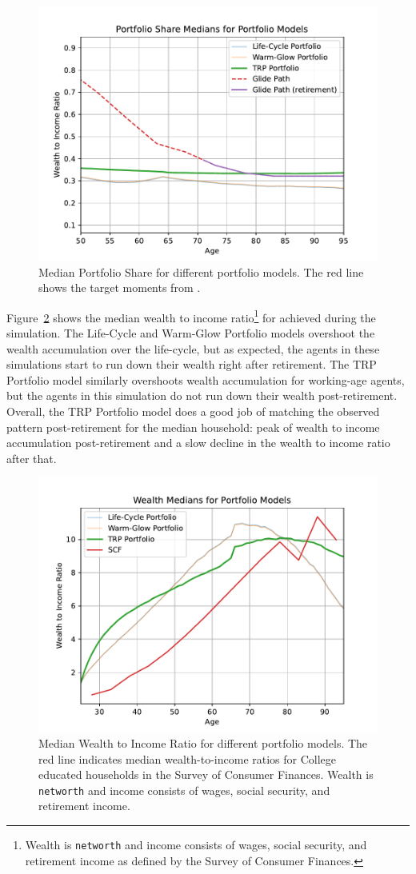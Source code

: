 \documentclass{article}
\begin{document}
\begin{figure}[!htbp]
\centering
\includegraphics[width=0.7\linewidth]{files/median_share-4914e6ae678815fe96333c65f71d7d38.pdf}
\caption[]{Median Portfolio Share for different portfolio models. The red line shows the target moments from \cite{Aboagye2024}.}
\label{medshare}
\end{figure}

Figure~\ref{medwealth} shows the median wealth to income ratio\footnote{Wealth is \texttt{networth} and income consists of wages, social security, and retirement income as defined by the Survey of Consumer Finances.} for achieved during the simulation. The Life-Cycle and Warm-Glow Portfolio models overshoot the wealth accumulation over the life-cycle, but as expected, the agents in these simulations start to run down their wealth right after retirement. The TRP Portfolio model similarly overshoots wealth accumulation for working-age agents, but the agents in this simulation do not run down their wealth post-retirement. Overall, the TRP Portfolio model does a good job of matching the observed pattern post-retirement for the median household: peak of wealth to income accumulation post-retirement and a slow decline in the wealth to income ratio after that.

\begin{figure}[!htbp]
\centering
\includegraphics[width=0.7\linewidth]{files/median_wealth-54ebc582b1bc7f823c4d514c0977f5a6.pdf}
\caption[]{Median Wealth to Income Ratio for different portfolio models. The red line indicates median wealth-to-income ratios for College educated households in the Survey of Consumer Finances. Wealth is \texttt{networth} and income consists of wages, social security, and retirement income.}
\label{medwealth}
\end{figure}
\end{document}
